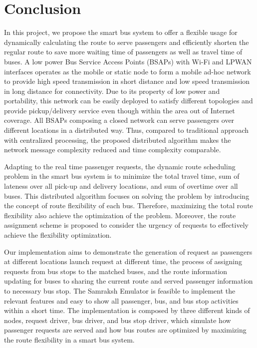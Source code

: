 \documentclass[runningheads]{llncs}
\begin{document}
\section{Conclusion}
In this project, we propose the smart bus system to offer a flexible usage for dynamically calculating the route to serve passengers and efficiently shorten the regular route to save more waiting time of passengers as well as travel time of buses. A low power Bus Service Access Points (BSAPs) with Wi-Fi and LPWAN interfaces operates as the mobile or static node to form a mobile ad-hoc network to provide high speed transmission in short distance and low speed transmission in long distance for connectivity. Due to its property of low power and portability, this network can be easily deployed to satisfy different topologies and provide pickup/delivery service even though within the area out of Internet coverage. All BSAPs composing a closed network can serve passengers over different locations in a distributed way. Thus, compared to traditional approach with centralized processing, the proposed distributed algorithm makes the network message complexity reduced and time complexity comparable.

Adapting to the real time passenger requests, the dynamic route scheduling problem in the smart bus system is to minimize the total travel time, sum of lateness over all pick-up and delivery locations, and sum of overtime over all buses. This distributed algorithm focuses on solving the problem by introducing the concept of route flexibility of each bus. Therefore, maximizing the total route flexibility also achieve the optimization of the problem. Moreover, the route assignment scheme is proposed to consider the urgency of requests to effectively achieve the flexibility optimization.

Our implementation aims to demonstrate the generation of request as passengers at different locations launch request at different time, the process of assigning requests from bus stops to the matched buses, and the route information updating for buses to sharing the current route and served passenger information to necessary bus stop. The Samraksh Emulator is feasible to implement the relevant features and easy to show all passenger, bus, and bus stop activities within a short time. The implementation is composed by three different kinds of nodes, request driver, bus driver, and bus stop driver, which simulate how passenger requests are served and how bus routes are optimized by maximizing the route flexibility in a smart bus system.
\end{document}
